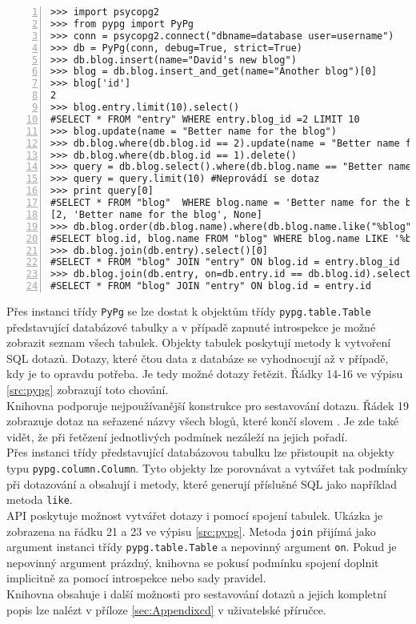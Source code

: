 \documentclass[ing,male,java,dept456]{diploma}						%
\begin{document}
\begin{lstlisting}[style=custompython, numbers=left, label=src:pypg, caption={Základy práce s knihovnou pypg}]
>>> import psycopg2
>>> from pypg import PyPg
>>> conn = psycopg2.connect("dbname=database user=username")
>>> db = PyPg(conn, debug=True, strict=True)
>>> db.blog.insert(name="David's new blog")
>>> blog = db.blog.insert_and_get(name="Another blog")[0]
>>> blog['id']
2
>>> blog.entry.limit(10).select()
#SELECT * FROM "entry" WHERE entry.blog_id =2 LIMIT 10
>>> blog.update(name = "Better name for the blog")
>>> db.blog.where(db.blog.id == 2).update(name = "Better name for the blog")
>>> db.blog.where(db.blog.id == 1).delete()
>>> query = db.blog.select().where(db.blog.name == "Better name for the blog") #Neprovádí se dotaz
>>> query = query.limit(10) #Neprovádí se dotaz
>>> print query[0]
#SELECT * FROM "blog"  WHERE blog.name = 'Better name for the blog' LIMIT 10
[2, 'Better name for the blog', None]
>>> db.blog.order(db.blog.name).where(db.blog.name.like("%blog")).select(db.blog.name)[0]
#SELECT blog.id, blog.name FROM "blog" WHERE blog.name LIKE '%blog' ORDER BY blog.name
>>> db.blog.join(db.entry).select()[0]
#SELECT * FROM "blog" JOIN "entry" ON blog.id = entry.blog_id
>>> db.blog.join(db.entry, on=db.entry.id == db.blog.id).select()[0]
#SELECT * FROM "blog" JOIN "entry" ON blog.id = entry.id
\end{lstlisting}

Přes instanci třídy \lstinline[style=inlinepython]|PyPg| se lze dostat k objektům třídy \lstinline[style=inlinepython]|pypg.table.Table| představující databázové tabulky a v případě zapnuté introspekce je možné zobrazit seznam všech tabulek. Objekty tabulek poskytují metody k vytvoření SQL dotazů. Dotazy, které čtou data z databáze se vyhodnocují až v případě, kdy je to opravdu potřeba. Je tedy možné dotazy řetězit. Řádky 14-16 ve výpisu \ref{src:pypg} zobrazují toto chování. \\
Knihovna podporuje nejpoužívanější konstrukce pro sestavování dotazu. Řádek 19 zobrazuje dotaz na seřazené názvy všech blogů, které končí slovem . Je zde také vidět, že při řetězení jednotlivých podmínek nezáleží na jejich pořadí. \\
Přes instanci třídy představující databázovou tabulku lze přistoupit na objekty typu \lstinline[style=inlinepython]|pypg.column.Column|. Tyto objekty lze porovnávat a vytvářet tak podmínky při dotazování a obsahují i metody, které generují příslušné SQL jako například metoda \lstinline[style=inlinepython]|like|. \\
API poskytuje možnost vytvářet dotazy i pomocí spojení tabulek. Ukázka je zobrazena na řádku 21 a 23 ve výpisu \ref{src:pypg}. Metoda \lstinline[style=inlinepython]|join| přijímá jako argument instanci třídy \lstinline[style=inlinepython]|pypg.table.Table| a nepovinný argument \lstinline[style=inlinepython]|on|. Pokud je nepovinný argument prázdný, knihovna se pokusí podmínku spojení doplnit implicitně za pomocí introspekce nebo sady pravidel. \\
Knihovna obsahuje i další možnosti pro sestavování dotazů a jejich kompletní popis lze nalézt v příloze \ref{sec:Appendixcd} v uživatelské příručce.
\end{document}
